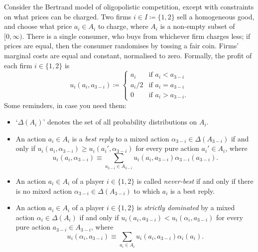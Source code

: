 \begin{exercise}
	\label{exercise:exam_ht25}
	Consider the Bertrand model of oligopolistic competition, except with constraints on what prices can be charged. Two firms $i \in I \coloneqq \{1,2\}$ sell a homogeneous good, and choose what price $a_i \in A_i$ to charge, where $A_i$ is a non-empty subset of $[0,\infty)$. There is a single consumer, who buys from whichever firm charges less; if prices are equal, then the consumer randomises by tossing a fair coin. Firms' marginal costs are equal and constant, normalised to zero. Formally, the profit of each firm $i \in \{1,2\}$ is
	\begin{equation*}
		u_i(a_i,a_{3-i})
		\coloneqq
		\begin{cases}
			a_i	& \text{if $a_i < a_{3-i}$}
			\\
			a_i/2	& \text{if $a_i = a_{3-i}$}
			\\
			0	& \text{if $a_i > a_{3-i}$.}
		\end{cases}
	\end{equation*}
	Some reminders, in case you need them:
	
	\begin{itemize}

		\item `$\Delta(A_i)$' denotes the set of all probability distributions on $A_i$.

		\item An action $a_i \in A_i$ is a \emph{best reply} to a mixed action $\alpha_{3-i} \in \Delta(A_{3-i})$ if and only if $u_i(a_i,\alpha_{3-i}) \geq u_i(a_i',\alpha_{3-i})$ for every pure action $a_i' \in A_i$, where
		\begin{equation*}
			u_i(a_i,\alpha_{3-i})
			\equiv \sum_{a_{3-i} \in A_{3-i}} u_i(a_i,a_{3-i}) \alpha_{3-i}(a_{3-i}) .
		\end{equation*}
	
		\item An action $a_i \in A_i$ of a player $i \in \{1,2\}$ is called \emph{never-best} if and only if there is no mixed action $\alpha_{3-i} \in \Delta(A_{3-i})$ to which $a_i$ is a best reply.

		\item An action $a_i \in A_i$ of a player $i \in \{1,2\}$ is \emph{strictly dominated} by a mixed action $\alpha_i \in \Delta(A_i)$ if and only if $u_i(a_i,a_{3-i}) < u_i(\alpha_i,a_{3-i})$ for every pure action $a_{3-i} \in A_{3-i}$, where
		\begin{equation*}
			u_i(\alpha_i,a_{3-i})
			\equiv \sum_{a_i \in A_i} u_i(a_i,a_{3-i}) \alpha_i(a_i) .
		\end{equation*}


\end{itemize}
\end{exercise}
